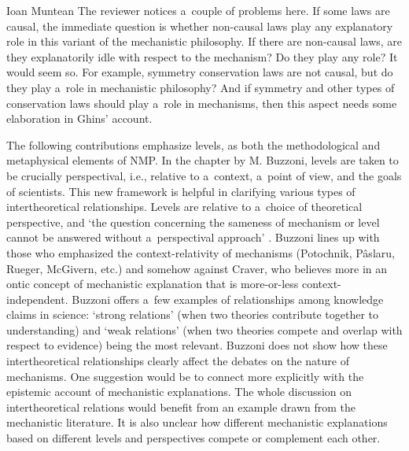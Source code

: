\begin{recengenv}{Ioan Muntean}
The reviewer notices a~couple of problems here. If some laws are causal, the immediate question is whether non-causal laws play any explanatory role in this variant of the mechanistic philosophy. If there are non-causal laws, are they explanatorily idle with respect to the mechanism? Do they play any role? It would seem so. For example, symmetry conservation laws are not causal, but do they play a~role in mechanistic philosophy? And if symmetry and other types of conservation laws should play a~role in mechanisms, then this aspect needs some elaboration in Ghins' account.

The following contributions emphasize levels, as both the methodological and metaphysical elements of NMP. In the chapter by M. Buzzoni, levels are taken to be crucially perspectival, i.e., relative to a~context, a~point of view, and the goals of scientists. This new framework is helpful in clarifying various types of intertheoretical relationships. Levels are relative to a~choice of theoretical perspective, and ‘the question concerning the sameness of mechanism or level cannot be answered without a~perspectival approach'
\parencite*[][p.118]{falkenburg_mechanistic_2019}. %
 Buzzoni lines up with those who emphasized the context-relativity of mechanisms (Potochnik, Pâslaru, Rueger, McGivern, etc.) and somehow against Craver, who believes more in an ontic concept of mechanistic explanation that is more-or-less context-independent. Buzzoni offers a~few examples of relationships among knowledge claims in science: ‘strong relations' (when two theories contribute together to understanding) and ‘weak relations' (when two theories compete and overlap with respect to evidence) being the most relevant. Buzzoni does not show how these intertheoretical relationships clearly affect the debates on the nature of mechanisms. One suggestion would be to connect more explicitly with the epistemic account of mechanistic explanations. The whole discussion on intertheoretical relations would benefit from an example drawn from the mechanistic literature. It is also unclear how different mechanistic explanations based on different levels and perspectives compete or complement each other.


\end{recengenv}
